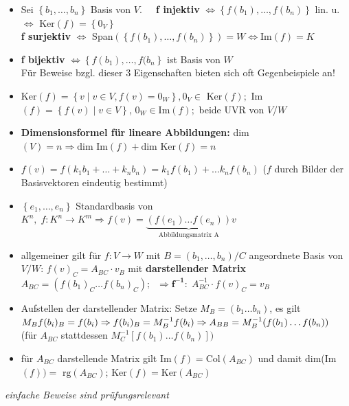 \documentclass[10pt,a4paper]{article}
\begin{document}
\begin{itemize}
\item Sei $\left\lbrace b_{1},\dotsc,b_{n}\right\rbrace$ Basis von $V.\;\;\;\;$   \textbf{f injektiv} $\Leftrightarrow \left\lbrace f(b_{1}), \dotsc,f(b_{n}) \right\rbrace $ lin. u. $\Leftrightarrow$ Ker$(f)=\left\lbrace 0_{V} \right\rbrace$\\
\textbf{f surjektiv} $\Leftrightarrow$ Span$(\left\lbrace f(b_{1}), \dotsc,f(b_{n}) \right\rbrace)=W\Leftrightarrow\text{Im}(f)=K$
\item\textbf{f bijektiv} $\Leftrightarrow \left\lbrace f(b_{1}), \dotsc,f(b_{n}\right\rbrace$ ist Basis von $W$\\ Für Beweise bzgl. dieser 3 Eigenschaften bieten sich oft Gegenbeispiele an!
\item Ker$(f)=\left\lbrace v \mid v \in V, f(v)=0_{W}\right\rbrace, 0_{V}\in\text{ Ker}(f);$ Im$(f)=\left\lbrace f(v) \mid v\in V\right\rbrace$, $0_{W}\in \text{Im}(f);$ beide UVR von $V$/$W$ 
\item \textbf{Dimensionsformel für lineare Abbildungen:} dim$(V)=n\Rightarrow\text{dim Im}(f)+\text{dim Ker}(f)=n$
\item $f(v)=f(k_{1}b_{1}+\dotsc + k_{n}b_{n})=k_{1}f(b_{1})+\dotsc k_{n}f(b_{n})$ ($f$ durch Bilder der Basisvektoren eindeutig bestimmt)
\item $\left\lbrace e_{1},\dotsc,e_{n}\right\rbrace$ Standardbasis von $K^{n},\;f: K^{n}\rightarrow K^{m}\Rightarrow f(v)=\underbrace{(f(e_{1})\dotsc f(e_{n}))}_{\text{Abbildungsmatrix A}}v$
\item allgemeiner gilt für $f:V\rightarrow W$ mit $B=(b_{1},\dotsc,b_{n})/C$ angeordnete Basis von $V/W$: $f(v)_{C}=A_{BC}\cdot v_{B}$ mit \textbf{darstellender Matrix} $A_{BC}=(f(b_{1})_{C}\dotsc f(b_{n})_{C});\;\;\Rightarrow\boldsymbol{f^{-1}:}\; A_{BC}^{-1}\cdot f(v)_{C}=v_{B} $ 
\item Aufstellen der darstellender Matrix: Setze $M_{B}=(b_{1} \dotsc b_{n})$, es gilt $M_{B}f(b_{i})_{B}=f(b_{i})\Rightarrow f(b_{i})_{B}= M_{B}^{-1}f(b_{i})\\ \Rightarrow A_{BB}=M_{B}^{-1}(f(b_{1})\dotsc f(b_{n}))\;\;\;\;$ (für $A_{BC}$ stattdessen $M_{C}^{-1}[f(b_{1})\dotsc f(b_{n})])$
\item für $A_{BC}$ darstellende Matrix gilt Im$(f)=\text{Col}(A_{BC})$ und damit dim(Im$(f))=\text{ rg}(A_{BC})$; Ker$(f)=\text{Ker}(A_{BC})$
\end{itemize}
\textit{einfache Beweise sind prüfungsrelevant}
\end{document}

